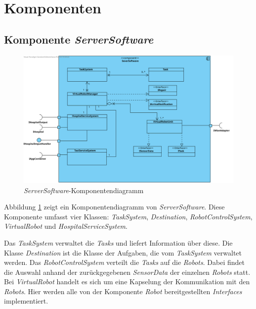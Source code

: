 \section{Komponenten}

\subsection{Komponente \textit{ServerSoftware}}
\begin{figure}[H]
\centering
\includegraphics[height=0.7\textwidth, angle=90]{img/2-Entwurf-5-ServerSoftware}
\caption{\emph{ServerSoftware}-Komponentendiagramm}
\label{KomponentenStruktur1}
\end{figure}
Abbildung \ref{KomponentenStruktur1} zeigt ein Komponentendiagramm von \emph{ServerSoftware}. 
Diese Komponente umfasst vier Klassen: \textit{TaskSystem}, \textit{Destination}, \textit{RobotControlSystem}, \textit{VirtualRobot} und \textit{HospitalServiceSystem}.


Das \textit{TaskSystem} verwaltet die \textit{Tasks} und liefert Information über diese. 
Die Klasse \textit{Destination} ist die Klasse
der Aufgaben, die vom \textit{TaskSystem} verwaltet werden. 
Das \textit{RobotControlSystem} verteilt die \textit{Tasks} auf die \textit{Robots}.
Dabei findet die Auswahl anhand der zurückgegebenen \textit{SensorData} der einzelnen \textit{Robots} statt. 
Bei \textit{VirtualRobot} handelt
es sich um eine Kapselung der Kommunikation mit den \textit{Robots}. 
Hier werden alle von der Komponente \textit{Robot} bereitgestellten
\textit{Interfaces} implementiert.
